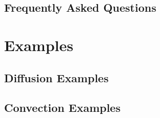 \documentclass[letterpaper,twoside,openright,10pt]{memoir}
\begin{document}


%

\chapter{Frequently Asked Questions}
\label{chap:FAQ}




% 
% 
% 



\sloppy

\part{Examples}
\label{part:Examples}



\renewcommand{\ptctitle}{Example Contents}
\parttoc

\chapter{Diffusion Examples}


\label{sec:Examples:diffusion:mesh1D}

\label{sec:Examples:diffusion:mesh20x20}

\label{sec:Examples:diffusion:circle}



\label{sec:Examples:diffusion:anisotropy}

\chapter{Convection Examples}
\end{document}

